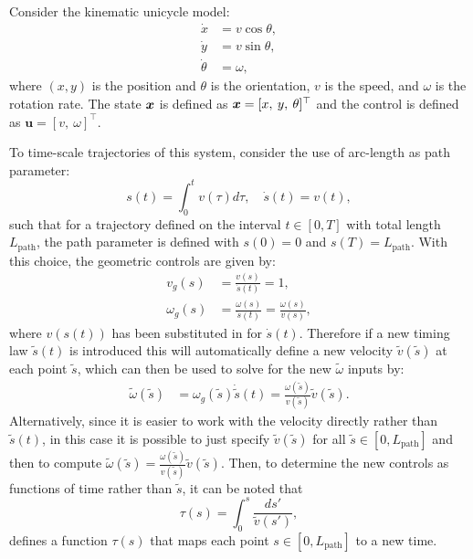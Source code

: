 \begin{example} \label{ex:timescaleuni}
\theoremstyle{definition}
Consider the kinematic unicycle model:
\begin{equation} \label{eq:unicycle}
\begin{split}
    \dot{x} &= v\cos\theta,\\
    \dot{y} &= v\sin\theta,\\
    \dot{\theta} &= \omega, 
\end{split}
\end{equation}
where $(x, y)$ is the position and $\theta$ is the orientation, $v$ is the speed, and $\omega$ is the rotation rate. The state $\bm{x}$ is defined as $\bm{x} = [x, \: y, \: \theta]^\top $ and the control is defined as $\bm{u} = [v, \:\omega]^\top $.

To time-scale trajectories of this system, consider the use of arc-length as path parameter:
\begin{equation*}
    s(t) = \int_0^t  v(\tau) d\tau, \quad \dot{s}(t) = v(t),
\end{equation*}
such that for a trajectory defined on the interval $t \in [0,T]$ with total length $L_{\text{path}}$, the path parameter is defined with $s(0) = 0$ and $s(T) = L_{\text{path}}$.
With this choice, the geometric controls are given by:
\begin{equation*}
\begin{split}
v_g(s) &= \frac{v(s)}{\dot{s}(t)} = 1, \\
\omega_g(s) &= \frac{\omega(s)}{\dot{s}(t)} = \frac{\omega(s)}{v(s)},
\end{split}
\end{equation*}
where $v(s(t))$ has been substituted in for $\dot{s}(t)$.
Therefore if a new timing law $\tilde{s}(t)$ is introduced this will automatically define a new velocity $\tilde{v}(\tilde{s})$ at each point $\tilde{s}$, which can then be used to solve for the new $\tilde{\omega}$ inputs by:
\begin{equation*}
\begin{split}
\tilde{\omega}(\tilde{s}) &= \omega_g(\tilde{s}) \dot{\tilde{s}}(t) = \frac{\omega(\tilde{s})}{v(\tilde{s})} \tilde{v}(\tilde{s}).
\end{split}
\end{equation*}
Alternatively, since it is easier to work with the velocity directly rather than $\tilde{s}(t)$, in this case it is possible to just specify $\tilde{v}(\tilde{s})$ for all $\tilde{s} \in [0, L_{\text{path}}]$ and then to compute $\tilde{\omega}(\tilde{s}) = \frac{\omega(\tilde{s})}{v(\tilde{s})} \tilde{v}(\tilde{s})$. Then, to determine the new controls as functions of time rather than $\tilde{s}$, it can be noted that
\begin{equation*}
    \tau(s) = \int_0^s \frac{ds'}{\tilde{v}(s')},
\end{equation*}
defines a function $\tau(s)$ that maps each point $s \in [0, L_{\text{path}}]$ to a new time.
\end{example}


